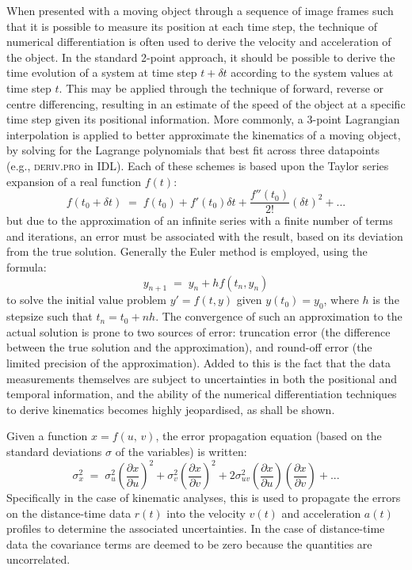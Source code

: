\documentclass[structabstract]{aa}
\begin{document}
When presented with a moving object through a sequence of image frames such that it is possible to measure its position at each time step, the technique of numerical differentiation is often used to derive the velocity and acceleration of the object. In the standard 2-point approach, it should be possible to derive the time evolution of a system at time step $t+\delta t$ according to the system values at time step $t$. This may be applied through the technique of forward, reverse or centre differencing, resulting in an estimate of the speed of the object at a specific time step given its positional information. More commonly, a 3-point Lagrangian interpolation is applied to better approximate the kinematics of a moving object, by solving for the Lagrange polynomials that best fit across three datapoints (e.g., \textsc{deriv.pro} in IDL). Each of these schemes is based upon the Taylor series expansion of a real function $f(t)$:
\begin{equation}
\label{taylor1}
f(t_0+\delta t) \; = \; f(t_0)+f'(t_0)\delta t +  \frac{f''(t_0)}{2!}(\delta t)^{2}  + ...
\end{equation}
but due to the approximation of an infinite series with a finite number of terms and iterations, an error must be associated with the result, based on its deviation from the true solution. Generally the Euler method is employed, using the formula:
\begin{equation}
y_{n+1} \; = \; y_n + h f(t_n, y_n)
\end{equation}
to solve the initial value problem $y'=f(t,y)$ given $y(t_0)=y_0$, where $h$ is the stepsize such that $t_n=t_0+nh$. The convergence of such an approximation to the actual solution is prone to two sources of error: truncation error (the difference between the true solution and the approximation), and round-off error (the limited precision of the approximation). Added to this is the fact that the data measurements themselves are subject to uncertainties in both the positional and temporal information, and the ability of the numerical differentiation techniques to derive kinematics becomes highly jeopardised, as shall be shown.

Given a function $x=f(u,\,v)$, the error propagation equation (based on the standard deviations $\sigma$ of the variables) is written:
\begin{equation}
\label{eqn_errorprop}
\sigma_x^2 \; = \; \sigma_u^2 \left(\frac{\partial x}{\partial u}\right) ^2 + \sigma_v^2 \left( \frac{\partial x}{\partial v} \right) ^2 + 2 \sigma_{uv}^2 \left( \frac{\partial x}{\partial u} \right) \left( \frac{\partial x}{\partial v} \right) + ...
\end{equation}
Specifically in the case of kinematic analyses, this is used to propagate the errors on the distance-time data $r(t)$ into the velocity $v(t)$ and acceleration $a(t)$ profiles to determine the associated uncertainties. In the case of distance-time data the covariance terms are deemed to be zero because the quantities are uncorrelated.
\end{document}
